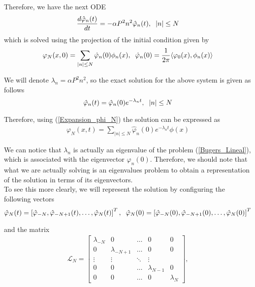 	\noindent Therefore, we have the next ODE
	\begin{align*}
		\frac{d \hat{\varphi}_n (t)}{dt} = - \alpha P^2 n^2 \hat{\varphi}_n (t), \hspace{2mm} |n| \leq N 
	\end{align*}
	which is solved using the projection of the initial condition given by
	\begin{align}
	\label{Galerkin_Linear}	
		\varphi_N (x, 0) = \displaystyle \sum_{|n| \leq N} \hat{\varphi}_n (0) \phi_n (x), \hspace{2mm} \hat{\varphi}_n (0) = \frac{1}{2 \pi} \langle \varphi_0 (x), \phi_n (x) \rangle   
	\end{align}
	
	We will denote $\lambda_n = \alpha P^2 n^2$, so the exact solution for the above system is given as follows
	\begin{align*}
		\hat{\varphi}_n (t) = \hat{\varphi}_n (0) e^{-\lambda_n t}, \hspace{2mm} |n| \leq N
	\end{align*} 
	
	Therefore, using (\ref{Expansion_phi_N}) the solution can be expressed as
	\begin{align*}
		\varphi_N (x, t) = \displaystyle \sum_{ |n| \leq N} \hat{\varphi}_n (0) e^{-\lambda_n t} \phi (x) 
	\end{align*}
	
	We can notice that $\lambda_n$ is actually an eigenvalue of the problem (\ref{Bugers_Lineal}), which is associated with the eigenvector $\varphi_n (0)$. Therefore, we should note that what we are actually solving is an eigenvalues ​​problem to obtain a representation of the solution in terms of its eigenvectors. \\
	
	To see this more clearly, we will represent the solution by configuring the following vectors
	\begin{align*}
		\hat{\varphi}_N (t) = \left[ \hat{\varphi}_{-N} , \hat{\varphi}_{-N + 1} (t), \dots, \hat{\varphi}_N (t)  \right]^T, \hspace{2mm} \hat{\varphi}_N (0) = \left[ \hat{\varphi}_{-N} (0) , \hat{\varphi}_{-N + 1} (0), \dots, \hat{\varphi}_N (0)  \right]^T
	\end{align*}
	
	\noindent and the matrix 
	\begin{align*}
		\displaystyle \mathcal{L}_N = {\begin{bmatrix}
				\lambda_{-N} & 0 & \ldots & 0 & 0\\
				0 & \lambda_{-N + 1} & \ldots & 0 & 0\\
				\vdots & \vdots & \ddots & \vdots \\
				0 & 0 & \ldots & \lambda_{N - 1} & 0\\
				0 & 0 & \ldots & 0 & \lambda_{N}
		\end{bmatrix}},
	\end{align*}
	
